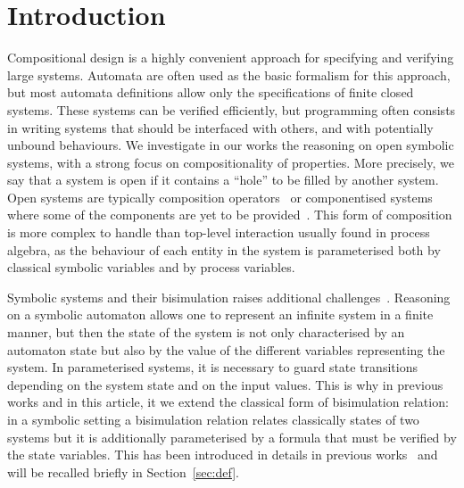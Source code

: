 \documentclass[runningheads]{llncs}
\begin{document}
\section{Introduction}
%
%
%
%
%
%
%
%
%

 Compositional design is a highly convenient approach 
for specifying and verifying large systems. 
Automata are often used as the basic formalism for this approach, but most automata definitions allow only the specifications of finite closed systems. These systems  can be verified efficiently, but programming often consists in writing  systems that should be interfaced with others, and with potentially unbound behaviours. We investigate in our works the reasoning on open symbolic systems, with a strong focus on compositionality of properties. More precisely, we say that a system is open if it contains a ``hole'' to be filled by another system. 
Open systems are typically composition operators~\cite{henrio:01299562} or componentised systems where some of the components are yet to be provided~\cite{AMHEEMA:2023}. This form of composition is more complex to handle than top-level interaction usually found in process algebra, as the behaviour of each entity in the system is parameterised both by classical symbolic variables and by process variables.

Symbolic systems and their bisimulation raises additional challenges~\cite{HENNESSY:1995,henrio:01299562}. Reasoning on a symbolic automaton allows one to represent an infinite system in a finite manner, but then the state of the system is not only characterised by an automaton state but also by the value of the different variables representing the system. In parameterised systems, it is necessary to guard state  transitions depending on the system state and on the input values. This is why in previous works and in this article, it we extend the classical form of bisimulation relation: in a symbolic setting a bisimulation relation relates classically states of two systems but it is additionally  parameterised by a formula that must be verified by the state variables. This has been introduced in details in previous works~\cite{AMHEEMA:2023,henrio:01299562} and will be recalled briefly in Section~\ref{sec:def}.
\end{document}
